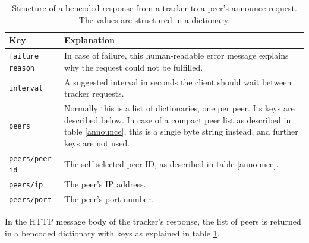 \documentclass[10pt, a4paper, twoside=false, headsepline]{scrbook}
\renewcommand{\_}{\origunderscore\allowbreak}
\begin{document}
\begin{table}
\centering
\begin{tabularx}{\textwidth}{lX}
\toprule
Key & Explanation \\
\midrule
\texttt{failure reason} & In case of failure, this human-readable error message explains why the request could not be fulfilled. \\
\texttt{interval} & A suggested interval in seconds the client should wait between tracker requests. \\
\texttt{peers} & Normally this is a list of dictionaries, one per peer. Its keys are described below. In case of a compact peer list as described in table \ref{announce}, this is a single byte string instead, and further keys are not used. \\
\texttt{peers/peer id} & The self-selected peer ID, as described in table \ref{announce}. \\
\texttt{peers/ip} & The peer's IP address. \\
\texttt{peers/port} & The peer's port number. \\
\bottomrule
\end{tabularx}
\caption[A tracker's response to an announce request]{Structure of a bencoded response from a tracker to a peer's announce request. The values are structured in a dictionary.}
\label{announce-response}
\end{table}

In the HTTP message body of the tracker's response, the list of peers is returned in a bencoded dictionary with keys as explained in table \ref{announce-response}.
\end{document}
